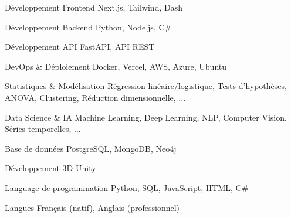 


\begin{cvskills}


\cvskill
{Développement Frontend} %
{Next.js, Tailwind, Dash} %


\cvskill
{Développement Backend} %
{Python, Node.js, C\#} %


\cvskill
{Développement API} %
{FastAPI, API REST} %

\cvskill
{DevOps \& Déploiement} %
{Docker, Vercel, AWS, Azure, Ubuntu} %


\cvskill
{Statistiques \& Modélisation} %
{Régression linéaire/logistique, Tests d'hypothèses, ANOVA, Clustering, Réduction dimensionnelle, ...} %



\cvskill
{Data Science \& IA} %
{Machine Learning, Deep Learning, NLP, Computer Vision, Séries temporelles, ...} %


\cvskill
{Base de données} %
{PostgreSQL, MongoDB, Neo4j} %


\cvskill
{Développement 3D} %
{Unity} %


\cvskill
{Language de programmation} %
{Python, SQL, JavaScript, HTML, C\#} %


\cvskill
{Langues} %
{Français (natif), Anglais (professionnel)} %


\end{cvskills}